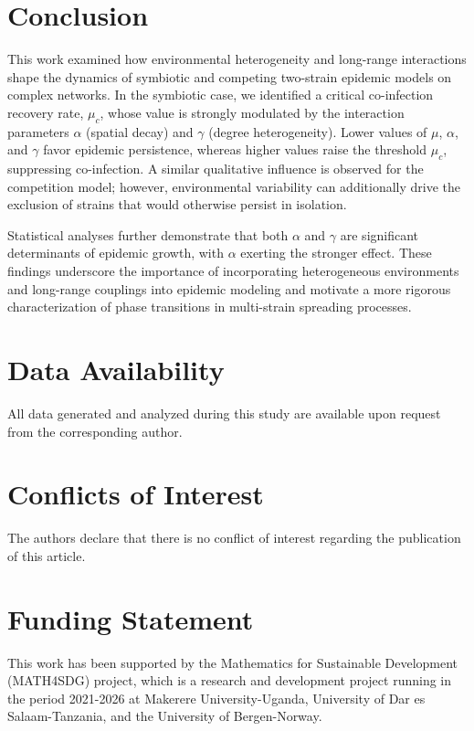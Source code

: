 \documentclass[a4paper,12pt]{scrartcl}
\theoremstyle{plain}%
\theoremstyle{definition}
\theoremstyle{remark}
\numberwithin{equation}{section}
\begin{document}
\section{Conclusion}

This work examined how environmental heterogeneity and long-range interactions shape the dynamics of symbiotic and competing two-strain epidemic models on complex networks. In the symbiotic case, we identified a critical co-infection recovery rate, $\mu_c$, whose value is strongly modulated by the interaction parameters $\alpha$ (spatial decay) and $\gamma$ (degree heterogeneity). Lower values of $\mu$, $\alpha$, and $\gamma$ favor epidemic persistence, whereas higher values raise the threshold $\mu_c$, suppressing co-infection.  A similar qualitative influence is observed for the competition model; however, environmental variability can additionally drive the exclusion of strains that would otherwise persist in isolation.

Statistical analyses further demonstrate that both $\alpha$ and $\gamma$ are significant determinants of epidemic growth, with $\alpha$ exerting the stronger effect. These findings underscore the importance of incorporating heterogeneous environments and long-range couplings into epidemic modeling and motivate a more rigorous characterization of phase transitions in multi-strain spreading processes. 



\section*{Data Availability}
All data generated and analyzed during this study are available upon request from the corresponding author.

\section*{Conflicts of Interest}
The authors declare that there is no conflict of interest regarding the publication of this article.

\section*{Funding Statement}

This work has been supported by the Mathematics for Sustainable Development (MATH4SDG) project, which is a research and development project running in the period 2021-2026 at Makerere University-Uganda, University of Dar es Salaam-Tanzania, and the University of Bergen-Norway.
\end{document}
